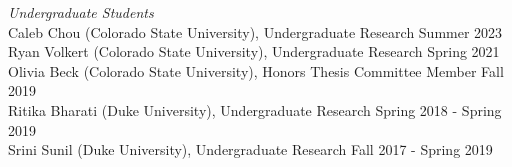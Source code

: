 \documentclass[margin,line]{res}
\begin{document}
\begin{resume}


\vspace{-.3cm}
{\em Undergraduate Students} \hfill \\
Caleb Chou (Colorado State University), Undergraduate Research \hfill Summer 2023 \\
Ryan Volkert (Colorado State University), Undergraduate Research \hfill Spring 2021 \\
Olivia Beck (Colorado State University), Honors Thesis Committee Member \hfill Fall 2019 \\
Ritika Bharati (Duke University), Undergraduate Research \hfill Spring 2018 - Spring 2019\\
Srini Sunil (Duke University), Undergraduate Research \hfill Fall 2017 - Spring 2019



\end{resume}
\end{document}
